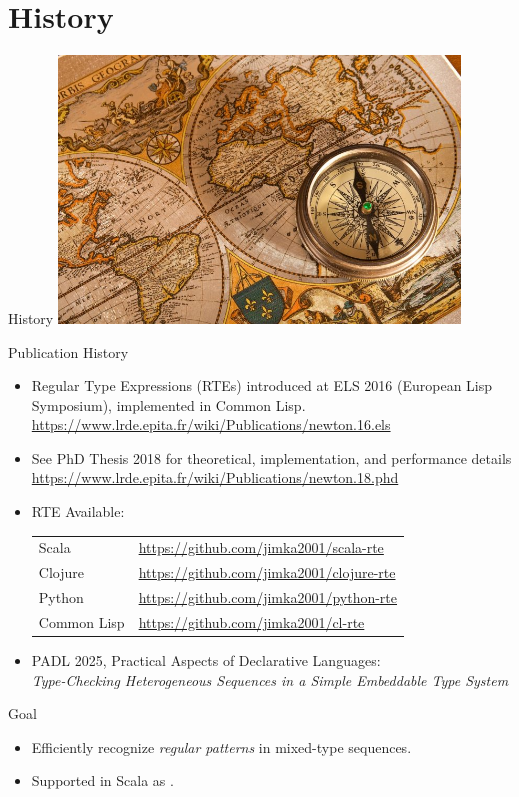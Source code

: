 \section{History}
{  %
\begin{frame}{History}
  \centering
  \includegraphics[width=0.8\textwidth]{history.jpg}
\end{frame}
}
\begin{frame}{Publication History}
  \begin{itemize}
  \item Regular Type Expressions (RTEs) introduced at ELS 2016 (European Lisp Symposium), implemented in Common Lisp.
    \url{https://www.lrde.epita.fr/wiki/Publications/newton.16.els}
  \item See PhD Thesis 2018 for theoretical, implementation, and performance details
    \url{https://www.lrde.epita.fr/wiki/Publications/newton.18.phd}
  \item   RTE Available:

    \medskip
    
  \begin{tabular}{ll}
    Scala & \url{https://github.com/jimka2001/scala-rte}\\
    Clojure & \url{https://github.com/jimka2001/clojure-rte}\\
    Python & \url{https://github.com/jimka2001/python-rte}\\
    Common Lisp & \url{https://github.com/jimka2001/cl-rte}    
  \end{tabular}
\item PADL 2025, Practical Aspects of Declarative Languages:\\\emph{Type-Checking Heterogeneous Sequences in a Simple Embeddable Type System}
  \end{itemize}
\end{frame}


\begin{frame}{Goal}
  \begin{itemize}
  \item Efficiently recognize \emph{regular patterns} in mixed-type sequences.
  \item Supported in Scala as .
  \end{itemize}
\end{frame}
